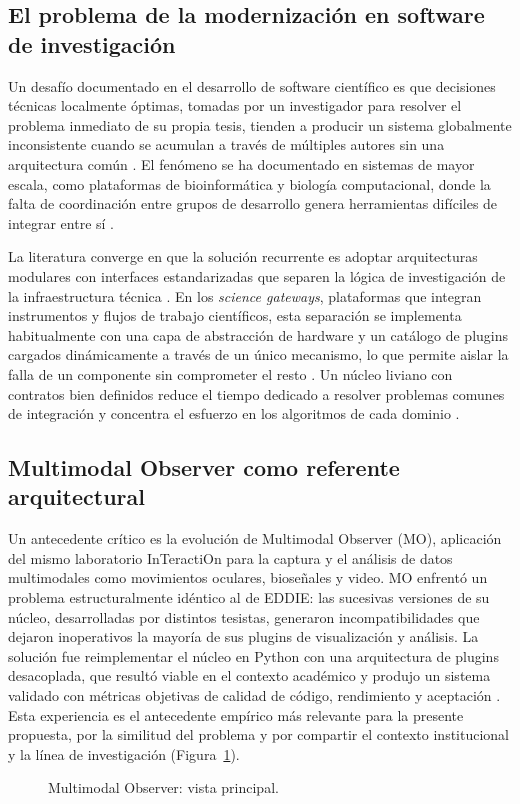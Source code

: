 \subsection{El problema de la modernización en software de investigación}

Un desafío documentado en el desarrollo de software científico es que decisiones técnicas localmente óptimas, tomadas por un investigador para resolver el problema inmediato de su propia tesis, tienden a producir un sistema globalmente inconsistente cuando se acumulan a través de múltiples autores sin una arquitectura común \citep{ernst2026}. El fenómeno se ha documentado en sistemas de mayor escala, como plataformas de bioinformática y biología computacional, donde la falta de coordinación entre grupos de desarrollo genera herramientas difíciles de integrar entre sí \citep{orozco2017}.

La literatura converge en que la solución recurrente es adoptar arquitecturas modulares con interfaces estandarizadas que separen la lógica de investigación de la infraestructura técnica \citep{bustio2013,glatard2017}. En los \textit{science gateways}, plataformas que integran instrumentos y flujos de trabajo científicos, esta separación se implementa habitualmente con una capa de abstracción de hardware y un catálogo de plugins cargados dinámicamente a través de un único mecanismo, lo que permite aislar la falla de un componente sin comprometer el resto \citep{glatard2017}. Un núcleo liviano con contratos bien definidos reduce el tiempo dedicado a resolver problemas comunes de integración y concentra el esfuerzo en los algoritmos de cada dominio \citep{bustio2013}.

\subsection{Multimodal Observer como referente arquitectural}

Un antecedente crítico es la evolución de Multimodal Observer (MO), aplicación del mismo laboratorio InTeractiOn para la captura y el análisis de datos multimodales como movimientos oculares, bioseñales y video. MO enfrentó un problema estructuralmente idéntico al de EDDIE: las sucesivas versiones de su núcleo, desarrolladas por distintos tesistas, generaron incompatibilidades que dejaron inoperativos la mayoría de sus plugins de visualización y análisis. La solución fue reimplementar el núcleo en Python con una arquitectura de plugins desacoplada, que resultó viable en el contexto académico y produjo un sistema validado con métricas objetivas de calidad de código, rendimiento y aceptación \citep{figueroa2025}. Esta experiencia es el antecedente empírico más relevante para la presente propuesta, por la similitud del problema y por compartir el contexto institucional y la línea de investigación (Figura~\ref{fig:mo}).

\begin{figure}[H]
\centering
{}
\caption{Multimodal Observer: vista principal.}
\label{fig:mo}
\end{figure}
